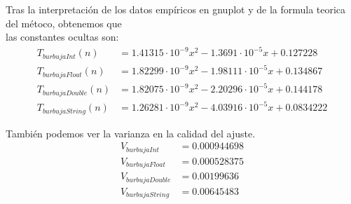 \documentclass[11pt]{article}
\begin{document}
Tras la interpretación de los datos empíricos en gnuplot y de la formula teorica del métoco, obtenemos que \\
las constantes ocultas son:
\begin{align*}
    T_{burbujaInt}(n) &=1.41315 \cdot 10^{-9}x^{2}-1.3691 \cdot 10^{-5}x+0.127228 \\
    T_{burbujaFloat}(n) &=1.82299 \cdot 10^{-9}x^{2}-1.98111 \cdot 10^{-5}x+0.134867 \\
    T_{burbujaDouble}(n) &=1.82075 \cdot 10^{-9}x^{2}-2.20296 \cdot 10^{-5}x+0.144178 \\
    T_{burbujaString}(n) &=1.26281 \cdot 10^{-9}x^{2}-4.03916 \cdot 10^{-5}x+0.0834222 
\end{align*}


También podemos ver la varianza en la calidad del ajuste. 
\begin{align*}
    V_{burbujaInt}&=0.000944698 \\
    V_{burbujaFloat}&=0.000528375 \\
    V_{burbujaDouble}&=0.00199636 \\
    V_{burbujaString}&=0.00645483
\end{align*}
\end{document}
